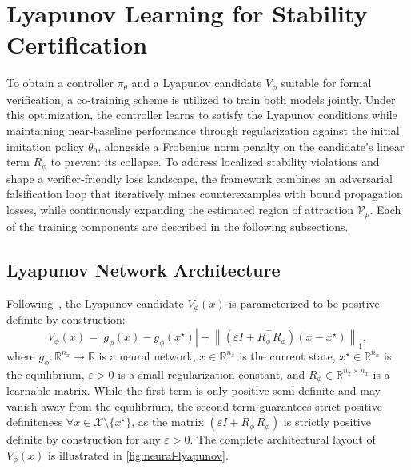 \section{Lyapunov Learning for Stability Certification}
\label{sec:lyapunov-learning}
To obtain a controller $\pi_\theta$ and a Lyapunov candidate $V_\phi$ suitable for formal verification, 
a co-training scheme is utilized to train both models jointly. 
Under this optimization, the controller learns to satisfy the Lyapunov conditions while maintaining near-baseline 
performance through regularization against the initial imitation policy $\theta_0$, alongside a Frobenius norm penalty 
on the candidate's linear term $R_\phi$ to prevent its collapse. 
To address localized stability violations and shape a verifier-friendly loss landscape, 
the framework combines an adversarial falsification loop that iteratively mines counterexamples with bound propagation losses, 
while continuously expanding the estimated region of attraction $\mathcal{V}_\rho$. Each of the training components are described 
in the following subsections.


\subsection{Lyapunov Network Architecture}
\label{subsec:lyapunov-network-architecture}

Following~\cite{yangLyapunovstableNeuralControl2024}, 
the Lyapunov candidate $V_\phi(x)$ is parameterized to be positive definite by construction:
\begin{equation}
    \label{eq:lyapunov-candidate}
    V_{\phi}(x) = \left| g_{\phi}(x) - g_{\phi}(x^\star) \right| 
        + \left\|  (\varepsilon I + R_\phi^\top R_\phi) (x - x^\star)  \right\|_1,
\end{equation}
where $g_{\phi} : \mathbb{R}^{n_x} \to \mathbb{R}$ is a neural network, $x \in \mathbb{R}^{n_x}$ is the current state, 
$x^\star \in \mathbb{R}^{n_x}$ is the equilibrium, $\varepsilon > 0$ is a small regularization constant, 
and $R_\phi \in \mathbb{R}^{n_x \times n_x}$ is a learnable matrix. 
While the first term is only positive semi-definite and may vanish away from the equilibrium, 
the second term guarantees strict positive definiteness $\forall x \in \mathcal{X} \setminus \{x^\star\}$, 
as the matrix $(\varepsilon I + R_\phi^\top R_\phi)$ is strictly 
positive definite by construction for any $\varepsilon > 0$.
The complete architectural layout of $V_\phi(x)$ is illustrated in \cref{fig:neural-lyapunov}.

